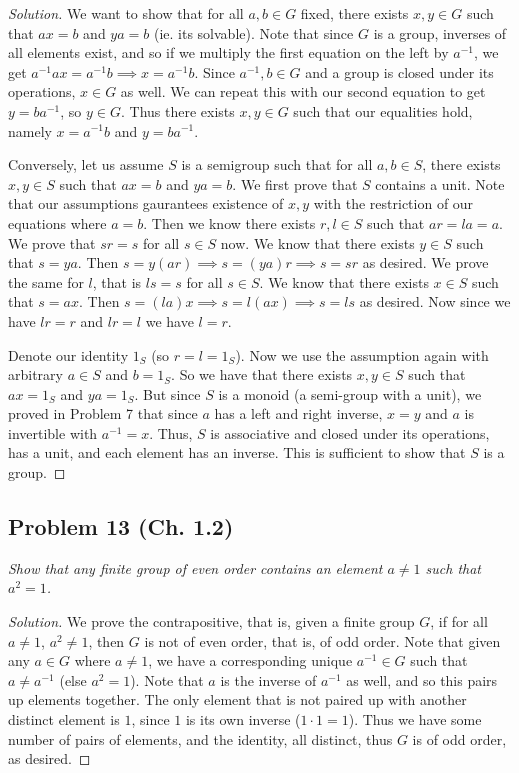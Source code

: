 \documentclass{article}
\begin{document}
\begin{proof}[Solution]\let\qed\relax
	We want to show that for all $a,b \in G$ fixed,
	there exists $x,y \in G$ such that $ax = b$ and $ya = b$ (ie. its solvable).
	Note that since $G$ is a group, inverses of all elements exist,
	and so if we multiply the first equation on the left by $a^{-1}$,
	we get $a^{-1}ax = a^{-1} b \implies x = a^{-1}b$.
	Since $a^{-1},b \in G$ and a group is closed under its operations,
	$x \in G$ as well.
	We can repeat this with our second equation to get $y = ba^{-1}$,
	so $y \in G$.
	Thus there exists $x,y \in G$ such that our equalities hold,
	namely $x = a^{-1}b$ and $y = ba^{-1}$.

	Conversely, let us assume $S$ is a semigroup such that for all $a,b \in S$,
	there exists $x,y \in S$ such that $ax = b$ and $ya = b$.
	We first prove that $S$ contains a unit.
	Note that our assumptions gaurantees existence of $x,y$
	with the restriction of our equations where $a = b$.
	Then we know there exists $r,l \in S$ such that $ar = la = a$.
	We prove that $sr = s$ for all $s \in S$ now.
	We know that there exists $y \in S$ such that $s = ya$.
	Then $s = y(ar) \implies s = (ya)r \implies s = sr$ as desired.
	We prove the same for $l$,
	that is $ls = s$ for all $s \in S$.
	We know that there exists $x \in S$ such that $s = ax$.
	Then $s = (la)x \implies s = l(ax) \implies s = ls$ as desired.
	Now since we have $lr = r$ and $lr = l$ we have $l = r$.

	Denote our identity $1_S$ (so $r = l = 1_S$).
	Now we use the assumption again with arbitrary $a \in S$ and $b = 1_S$.
	So we have that there exists $x,y \in S$ such that $ax = 1_S$ and $ya = 1_S$.
	But since $S$ is a monoid (a semi-group with a unit),
	we proved in Problem 7 that since $a$ has a left and right inverse,
	$x = y$ and $a$ is invertible with $a^{-1} = x$.
	Thus, $S$ is associative and closed under its operations,
	has a unit,
	and each element has an inverse.
	This is sufficient to show that $S$ is a group.
\end{proof}

\subsection*{Problem 13 (Ch. 1.2)}
{\it Show that any finite group of even order contains an element $a \neq 1$
such that $a^2 = 1$.}

\begin{proof}[Solution]\let\qed\relax
	We prove the contrapositive, that is,
	given a finite group $G$,
	if for all $a \neq 1$, $a^2 \neq 1$,
	then $G$ is not of even order, that is, of odd order.
	Note that given any $a \in G$ where $a \neq 1$,
	we have a corresponding unique $a^{-1}\in G$
	such that $a \neq a^{-1}$ (else $a^2 = 1$).
	Note that $a$ is the inverse of $a^{-1}$ as well,
	and so this pairs up elements together.
	The only element that is not paired up with another distinct element is $1$,
	since $1$ is its own inverse ($1\cdot 1 = 1$).
	Thus we have some number of pairs of elements,
	and the identity, all distinct,
	thus $G$ is of odd order, as desired.
\end{proof}
\end{document}
